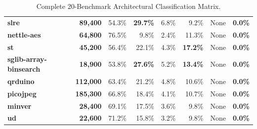 \documentclass[11pt,a4paper]{article}
\begin{document}
\begin{table}[h!]
\begin{tabularx}{\textwidth}{>{\raggedright\arraybackslash}X r r r r r l r}
\rowcolor{red!06}\textbf{slre}              & \textbf{89,400}  & 54.3\% & \textbf{29.7\%} & 6.8\% & 9.2\%  & None & \textbf{0.0\%} \\
\rowcolor{red!06}\textbf{nettle-aes}        & \textbf{64,800}  & 76.5\% & 9.8\%  & 2.4\% & 11.3\% & None & \textbf{0.0\%} \\
\rowcolor{red!06}\textbf{st}                & \textbf{45,200}  & 56.4\% & 22.1\% & 4.3\% & \textbf{17.2\%} & None & \textbf{0.0\%} \\
\rowcolor{red!06}\textbf{sglib-array-binsearch}& \textbf{18,900}& 53.8\% & \textbf{27.6\%} & 5.2\% & \textbf{13.4\%} & None & \textbf{0.0\%} \\
\rowcolor{red!06}\textbf{qrduino}           & \textbf{112,000} & 63.4\% & 21.2\% & 4.8\% & 10.6\% & None & \textbf{0.0\%} \\
\rowcolor{red!06}\textbf{picojpeg}          & \textbf{185,300} & 66.8\% & 18.4\% & 4.1\% & 10.7\% & None & \textbf{0.0\%} \\
\rowcolor{red!06}\textbf{minver}            & \textbf{28,400}  & 69.1\% & 17.5\% & 3.6\% & 9.8\%  & None & \textbf{0.0\%} \\
\rowcolor{red!06}\textbf{ud}                & \textbf{22,600}  & 71.2\% & 15.8\% & 3.2\% & 9.8\%  & None & \textbf{0.0\%} \\
\bottomrule
\end{tabularx}
\caption{Complete 20-Benchmark Architectural Classification Matrix.}
\label{tab:classification_matrix}
\end{table}
\end{document}
